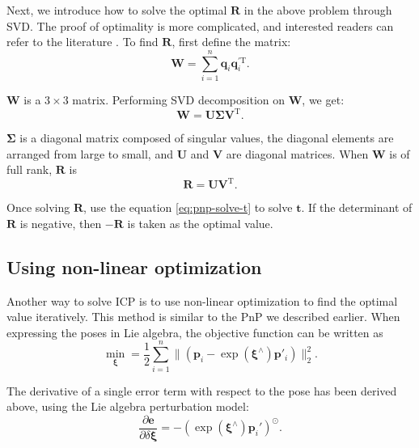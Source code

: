 Next, we introduce how to solve the optimal $\mathbf{R}$ in the above problem through SVD. The proof of optimality is more complicated, and interested readers can refer to the literature \cite{Arun1987, PomerleauColasSiegwart2015}. To find $\mathbf{R}$, first define the matrix:
\begin{equation}
\mathbf{W} =  \sum\limits_{i = 1}^n \mathbf{q}_i \mathbf{q}^{\prime \mathrm{T}}_i.
\end{equation}

$\mathbf{W}$ is a $3 \times 3$ matrix. Performing SVD decomposition on $\mathbf{W}$, we get:
\begin{equation}
\mathbf{W} = \mathbf{U \Sigma V}^\mathrm{T}.
\end{equation}

$\mathbf{\Sigma}$ is a diagonal matrix composed of singular values, the diagonal elements are arranged from large to small, and $\mathbf{U}$ and $\mathbf{V}$ are diagonal matrices. When $\mathbf{W}$ is of full rank, $\mathbf{R}$ is
\begin{equation}
\mathbf{R} = \mathbf{U} \mathbf{V}^\mathrm{T}.
\end{equation}

Once solving $\mathbf{R}$, use the equation \eqref{eq:pnp-solve-t} to solve $\mathbf{t}$. If the determinant of $\mathbf{R}$ is negative, then $-\mathbf{R}$ is taken as the optimal value.

\subsection{Using non-linear optimization}
Another way to solve ICP is to use non-linear optimization to find the optimal value iteratively. This method is similar to the PnP we described earlier. When expressing the poses in Lie algebra, the objective function can be written as
\begin{equation}
\mathop {\min }\limits_{\boldsymbol{\xi}} = \frac{1}{2} \sum\limits_{i = 1}^n\| {\left( {{{\mathbf{p}}_i} - \exp \left( \boldsymbol{\xi}^\wedge \right) {\mathbf{p}}'_i} \right)} \|^2_2.
\end{equation}

The derivative of a single error term with respect to the pose has been derived above, using the Lie algebra perturbation model:
\begin{equation}
\frac{{\partial \mathbf{e}}}{{\partial \delta \boldsymbol{\xi} }} =  - {\left( {\exp \left( {{ \boldsymbol{\xi} ^ \wedge }} \right){{\mathbf{p}}_i}'} \right)^ \odot }.
\end{equation}

